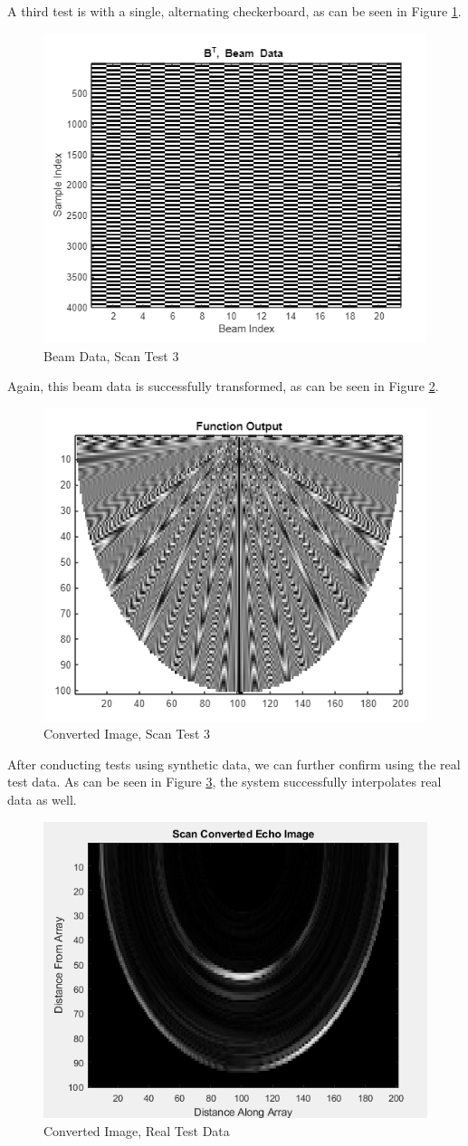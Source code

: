 A third test is with a single, alternating checkerboard, as can be seen in Figure \ref{fig:scan_checker1}.

\begin{figure}[H]
    \centering
    \includegraphics[width=0.5\linewidth]{figures/scan_checker1.png}
    \caption{Beam Data, Scan Test 3}
    \label{fig:scan_checker1}
\end{figure}

Again, this beam data is successfully transformed, as can be seen in Figure \ref{fig:scan_checker1_out}.

\begin{figure}[H]
    \centering
    \includegraphics[width=0.5\linewidth]{figures/scan_checker1_out.png}
    \caption{Converted Image, Scan Test 3}
    \label{fig:scan_checker1_out}
\end{figure}

After conducting tests using synthetic data, we can further confirm using the real test data.  As can be seen in Figure \ref{fig:scan_real}, the system successfully interpolates real data as well.

\begin{figure}[H]
    \centering
    \includegraphics[width=0.5\linewidth]{figures/scan_real.png}
    \caption{Converted Image, Real Test Data}
    \label{fig:scan_real}
\end{figure}

